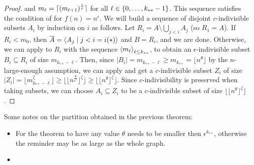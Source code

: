 \begin{theorem}[Theorem 4.23]
\begin{proof}
            and $m_{\ell} = \lceil ( m_{\ell+1} )^{\frac{1}{\epsilon}} \rceil$ for all $\ell \in \{ 0, \dots, k_{**}-1 \}$.
            This sequence satisfies the condition of  for $f(n) = n^\epsilon$.
            We will build a sequence of disjoint $c$-indivisible subsets $A_i$ by induction on $i$ as follows.
            Let $R_i = A \setminus \bigcup_{j<i} A_j$ (so $R_1 = A$).
            If $R_i < m_0$, then
            $\overline{A} = \left< A_j \mid j < i = i(*) \right>$ and $B = R_i$, and we are done.
            Otherwise, we can apply  to $R_i$ with the sequence
            $\left< m_\ell \right>_{\ell \leq k_{**}}$, to obtain an $\epsilon$-indivisible subset $B_i \subseteq R_i$ of
            size $m_{k_{**}-\ell}$. 
            Then, since $|B_i| = m_{k_{**}-\ell} \geq m_{k_{**}} = \lfloor n^\theta \rfloor$ by the $n$-large-enough assumption,
            we can apply  and get a
            $c$-indivisible subset $Z_i$ of size $|Z_i| = \lfloor m_{k_{**}-\ell}^\zeta \rfloor
            \geq \lfloor \lfloor n^{\frac{\theta}{\epsilon^\ell}} \rfloor ^\zeta \rfloor
            \geq \lfloor \lfloor n^{\theta} \rfloor ^\zeta \rfloor$.
            Since $c$-indivisibility is preserved when taking subsets,
            we can choose $A_i \subseteq Z_i$ to be a $c$-indivisible subset of size $\lfloor \lfloor n^{\theta} \rfloor ^\zeta \rfloor$.
        \end{proof}
    \end{theorem}


    \begin{remark}
        Some notes on the partition obtained in the previous theorem:
        \begin{itemize}
            \item For the theorem to have any value $\theta$ needs to be smaller then $\epsilon^{k_{**}}$, otherwise the
                reminder may be as large as the whole graph.
            \item \jojo
        \end{itemize}
    \end{remark}

